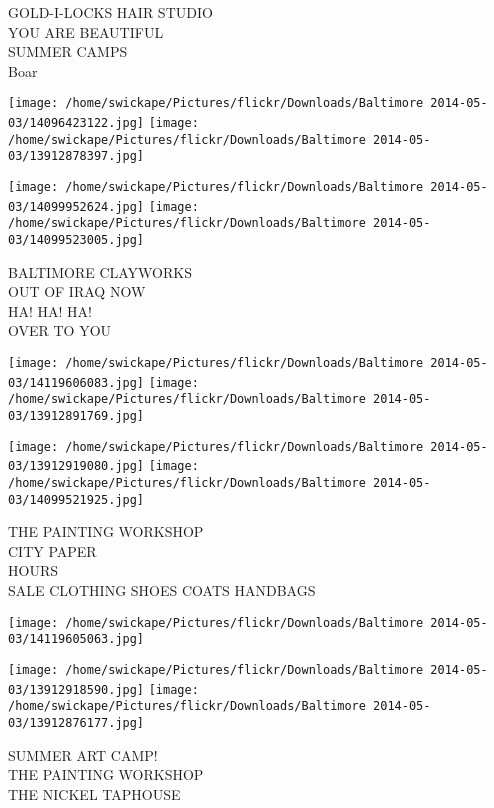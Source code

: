 \documentclass[10pt,letterpaper]{article}
\begin{document}
GOLD{-}I{-}LOCKS HAIR STUDIO\\
YOU ARE BEAUTIFUL\\
SUMMER CAMPS\\
Boar\\
\pagebreak

\texttt{[image: /home/swickape/Pictures/flickr/Downloads/Baltimore 2014-05-03/14096423122.jpg]}
\texttt{[image: /home/swickape/Pictures/flickr/Downloads/Baltimore 2014-05-03/13912878397.jpg]}

\texttt{[image: /home/swickape/Pictures/flickr/Downloads/Baltimore 2014-05-03/14099952624.jpg]}
\texttt{[image: /home/swickape/Pictures/flickr/Downloads/Baltimore 2014-05-03/14099523005.jpg]}

BALTIMORE CLAYWORKS\\
OUT OF IRAQ NOW\\
HA! HA! HA!\\
OVER TO YOU\\
\pagebreak

\texttt{[image: /home/swickape/Pictures/flickr/Downloads/Baltimore 2014-05-03/14119606083.jpg]}
\texttt{[image: /home/swickape/Pictures/flickr/Downloads/Baltimore 2014-05-03/13912891769.jpg]}

\texttt{[image: /home/swickape/Pictures/flickr/Downloads/Baltimore 2014-05-03/13912919080.jpg]}
\texttt{[image: /home/swickape/Pictures/flickr/Downloads/Baltimore 2014-05-03/14099521925.jpg]}

THE PAINTING WORKSHOP\\
CITY PAPER\\
HOURS\\
SALE CLOTHING SHOES COATS HANDBAGS\\
\pagebreak

\texttt{[image: /home/swickape/Pictures/flickr/Downloads/Baltimore 2014-05-03/14119605063.jpg]}

\vspace{0.25in}
\texttt{[image: /home/swickape/Pictures/flickr/Downloads/Baltimore 2014-05-03/13912918590.jpg]}
\texttt{[image: /home/swickape/Pictures/flickr/Downloads/Baltimore 2014-05-03/13912876177.jpg]}

SUMMER ART CAMP!\\
THE PAINTING WORKSHOP\\
THE NICKEL TAPHOUSE\\
\pagebreak
\end{document}
